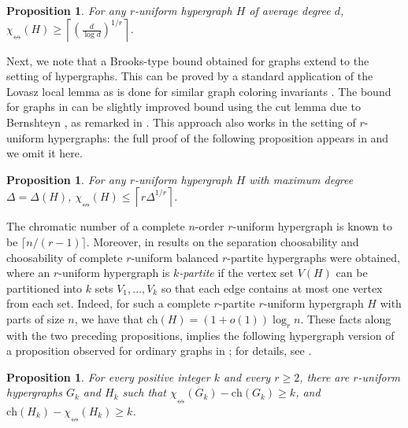 \documentclass[12pt]{article}
\newtheorem{proposition}[theorem]{Proposition}
\newcommand{\single}{\chi_{\nleftrightarrow}}
\newcommand{\ch}{\mathrm{ch}}
\newcommand{\sing}{\chi_{\nleftrightarrow}}
\newcommand{\1}{\mathds{1}}
\begin{document}
\begin{proposition}
\label{prop:hyplowerbound}
	For any $r$-uniform hypergraph $H$ of average degree $d$,
	$\single(H) \geq \left\lceil \left(\frac{d}{\log d}\right)^{1/r}\right\rceil$.
\end{proposition}


	Next, we note that a Brooks-type bound obtained for graphs
	\cite{DvorakEsperetKangOzeki} extend to the setting of hypergraphs.
	This can be proved by a standard application of the Lovasz local lemma as
	is done for similar graph coloring
	invariants \cite{DvorakEsperetKangOzeki, KostochkaZhu, KratochvilTuzaVoigt}.
	The bound for graphs in \cite{DvorakEsperetKangOzeki} can be
	slightly improved bound using the cut lemma due to
	Bernshteyn \cite{Bernshteyn2}, as remarked  in \cite{DvorakEsperetKangOzeki}.
	This approach also works in the setting of $r$-uniform hypergraphs:
	the full proof of the following proposition appears in \cite{Eriksson} and we omit it here.

\begin{proposition}
\label{prop:maxdegree}
	For any $r$-uniform hypergraph $H$ with maximum degree $\Delta=\Delta(H)$,
    $
    \sing(H)\leq \left \lceil r \Delta^{1/r}\right  \rceil. 
    $
\end{proposition}






\newcommand{\K}{\mathcal{K}}
The chromatic number of a complete $n$-order $r$-uniform hypergraph is known to be $\lceil n/(r-1)\rceil$. 
Moreover, in \cite{FurediKostochkaKumbhat} results on the separation choosability and choosability of 
complete $r$-uniform balanced $r$-partite hypergraphs were obtained, where an $r$-uniform hypergraph
is \emph{$k$-partite} if the vertex set $V(H)$ can be partitioned into $k$ sets $V_1,\dots, V_k$ so that each edge contains at most one vertex from each set. Indeed, for such a complete  $r$-partite $r$-uniform hypergraph $H$ with parts of size $n$, we have that $\ch(H) = (1+o(1))\log_r n$.
These facts along with the two preceding propositions, implies the following
hypergraph version of a proposition observed for ordinary graphs in \cite{CasselgrenEriksson};
for details, see \cite{Eriksson}.




\begin{proposition}
    For every positive integer $k$ and every $r\geq 2$, there are $r$-uniform hypergraphs $G_k$ and $H_k$ such that $\sing(G_k)-\ch(G_k)\geq k$, and $\ch(H_k)-\sing(H_k)\geq k$.
\end{proposition}
\end{document}
